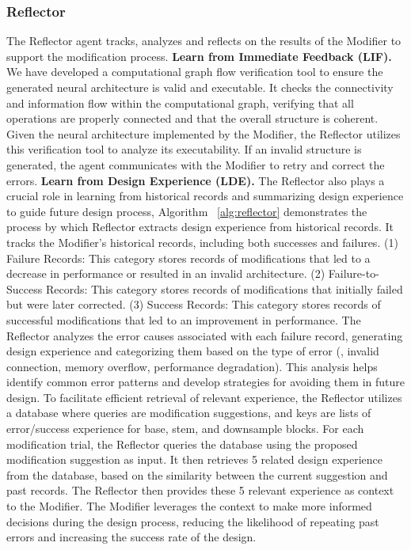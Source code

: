 \subsubsection{Reflector} 
The Reflector agent tracks, analyzes and reflects on the results of the Modifier to support the modification process.
\textbf{Learn from Immediate Feedback (LIF).} 
We have developed a computational graph flow verification tool to ensure the generated neural architecture is valid and executable. It checks the connectivity and information flow within the computational graph, verifying that all operations are properly connected and that the overall structure is coherent. Given the neural architecture implemented by the Modifier, the Reflector utilizes this verification tool to analyze its executability. If an invalid structure is generated, the agent communicates with the Modifier to retry and correct the errors.
\textbf{Learn from Design Experience (LDE).} The Reflector also plays a crucial role in learning from historical records and summarizing design experience to guide future design process, Algorithm ~\ref{alg:reflector} demonstrates the process by which Reflector extracts design experience from historical records. 
It tracks the Modifier's historical records, including both successes and failures.
(1) Failure Records: This category stores records of modifications that led to a decrease in performance or resulted in an invalid architecture.
(2) Failure-to-Success Records: This category stores records of modifications that initially failed but were later corrected. 
(3) Success Records: This category stores records of successful modifications that led to an improvement in performance. 
The Reflector analyzes the error causes associated with each failure record, generating design experience and categorizing them based on the type of error (\eg, invalid connection, memory overflow, performance degradation). This analysis helps identify common error patterns and develop strategies for avoiding them in future design.
To facilitate efficient retrieval of relevant experience, the Reflector utilizes a database where queries are modification suggestions, and keys are lists of error/success experience for base, stem, and downsample blocks. For each modification trial, the Reflector queries the database using the proposed modification suggestion as input. It then retrieves 5 related design experience from the database, based on the similarity between the current suggestion and past records. The Reflector then provides these 5 relevant experience as context to the Modifier. The Modifier leverages the context to make more informed decisions during the design process, reducing the likelihood of repeating past errors and increasing the success rate of the design.